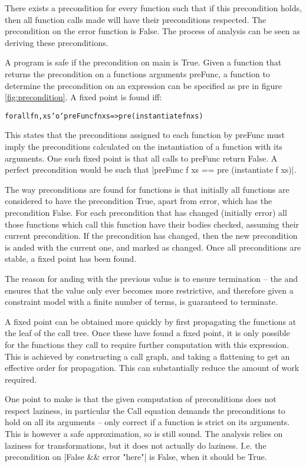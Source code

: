 \documentclass[preprint]{sigplanconf}
\newcommand{\C}[1]{\textsf{#1}}
\newenvironment{code}{\begin{alltt}\small}{\end{alltt}}
\begin{document}
There exists a precondition for every function such that if this precondition holds, then all function calls made will have their preconditions respected. The precondition on the \C{error} function is False. The process of analysis can be seen as deriving these preconditions.

A program is safe if the precondition on \C{main} is True. Given a function that returns the precondition on a functions arguments \C{preFunc}, a function to determine the precondition on an expression can be specified as \C{pre} in figure \ref{fig:precondition}. A fixed point is found iff:

\begin{code}
forall fn, xs `o` preFunc fn xs => pre (instantiate fn xs)
\end{code}

This states that the preconditions assigned to each function by \C{preFunc} must imply the preconditions calculated on the instantiation of a function with its arguments. One such fixed point is that all calls to \C{preFunc} return False. A perfect precondition would be such that |preFunc f xs == pre (instantiate f xs)|.

The way preconditions are found for functions is that initially all functions are considered to have the precondition True, apart from error, which has the precondition False. For each precondition that has changed (initially error) all those functions which call this function have their bodies checked, assuming their current precondition. If the precondition has changed, then the new precondition is anded with the current one, and marked as changed. Once all preconditions are stable, a fixed point has been found.

The reason for anding with the previous value is to ensure termination -- the and ensures that the value only ever becomes more restrictive, and therefore given a constraint model with a finite number of terms, is guaranteed to terminate.

A fixed point can be obtained more quickly by first propagating the functions at the leaf of the call tree. Once these have found a fixed point, it is only possible for the functions they call to require further computation with this expression. This is achieved by constructing a call graph, and taking a flattening to get an effective order for propagation. This can substantially reduce the amount of work required.

One point to make is that the given computation of preconditions does not respect laziness, in particular the \C{Call} equation demands the preconditions to hold on all its arguments -- only correct if a function is strict on its arguments. This is however a safe approximation, so is still sound. The analysis relies on laziness for transformations, but it does not actually do laziness. I.e. the precondition on |False && error "here"| is False, when it should be True.
\end{document}
